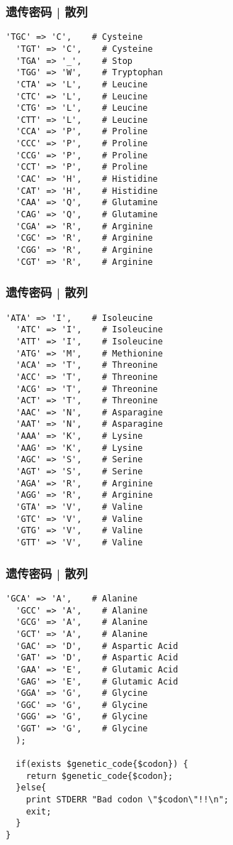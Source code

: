 \begin{frame}[fragile]
  \frametitle{遗传密码 | 散列}
\begin{lstlisting}[firstnumber=26,basicstyle=\scriptsize\tt,numberstyle=\tiny]
  'TGC' => 'C',    # Cysteine
  'TGT' => 'C',    # Cysteine
  'TGA' => '_',    # Stop
  'TGG' => 'W',    # Tryptophan
  'CTA' => 'L',    # Leucine
  'CTC' => 'L',    # Leucine
  'CTG' => 'L',    # Leucine
  'CTT' => 'L',    # Leucine
  'CCA' => 'P',    # Proline
  'CCC' => 'P',    # Proline
  'CCG' => 'P',    # Proline
  'CCT' => 'P',    # Proline
  'CAC' => 'H',    # Histidine
  'CAT' => 'H',    # Histidine
  'CAA' => 'Q',    # Glutamine
  'CAG' => 'Q',    # Glutamine
  'CGA' => 'R',    # Arginine
  'CGC' => 'R',    # Arginine
  'CGG' => 'R',    # Arginine
  'CGT' => 'R',    # Arginine
\end{lstlisting}
\end{frame}

\begin{frame}[fragile]
  \frametitle{遗传密码 | 散列}
\begin{lstlisting}[firstnumber=46,basicstyle=\scriptsize\tt,numberstyle=\tiny]
  'ATA' => 'I',    # Isoleucine
  'ATC' => 'I',    # Isoleucine
  'ATT' => 'I',    # Isoleucine
  'ATG' => 'M',    # Methionine
  'ACA' => 'T',    # Threonine
  'ACC' => 'T',    # Threonine
  'ACG' => 'T',    # Threonine
  'ACT' => 'T',    # Threonine
  'AAC' => 'N',    # Asparagine
  'AAT' => 'N',    # Asparagine
  'AAA' => 'K',    # Lysine
  'AAG' => 'K',    # Lysine
  'AGC' => 'S',    # Serine
  'AGT' => 'S',    # Serine
  'AGA' => 'R',    # Arginine
  'AGG' => 'R',    # Arginine
  'GTA' => 'V',    # Valine
  'GTC' => 'V',    # Valine
  'GTG' => 'V',    # Valine
  'GTT' => 'V',    # Valine
\end{lstlisting}
\end{frame}

\begin{frame}[fragile]
  \frametitle{遗传密码 | 散列}
\begin{lstlisting}[firstnumber=66,basicstyle=\scriptsize\tt,numberstyle=\tiny]
  'GCA' => 'A',    # Alanine
  'GCC' => 'A',    # Alanine
  'GCG' => 'A',    # Alanine
  'GCT' => 'A',    # Alanine
  'GAC' => 'D',    # Aspartic Acid
  'GAT' => 'D',    # Aspartic Acid
  'GAA' => 'E',    # Glutamic Acid
  'GAG' => 'E',    # Glutamic Acid
  'GGA' => 'G',    # Glycine
  'GGC' => 'G',    # Glycine
  'GGG' => 'G',    # Glycine
  'GGT' => 'G',    # Glycine
  );

  if(exists $genetic_code{$codon}) {
    return $genetic_code{$codon};
  }else{
    print STDERR "Bad codon \"$codon\"!!\n";
    exit;
  }
}
\end{lstlisting}
\end{frame}

